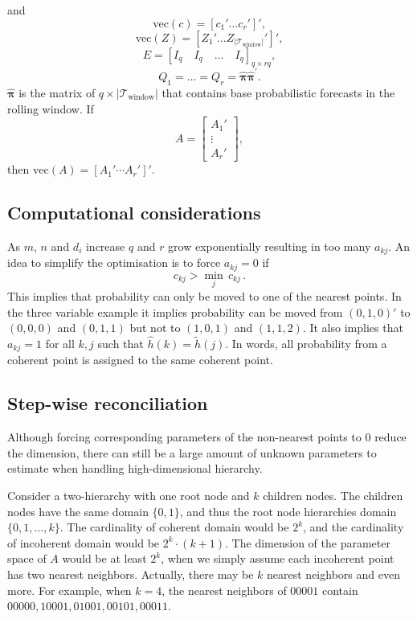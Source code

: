 \documentclass[a4paper,review,12pt,authoryear]{elsarticle}
\begin{document}
    and
    \[\textrm{vec}(c) = \left[c_1' \dots c_r'\right]',\]
    \[\textrm{vec}(Z) = \left[Z_1' \dots Z_{|\mathcal{T}_{\textrm{window}}|}'\right]',\]
    \[E = [I_q \quad I_q  \quad \dots \quad I_q]_{q\times rq},\]
    \[Q_1 =\dots =Q_r = \hat{\boldsymbol{\pi}}\hat{\boldsymbol{\pi}}^\prime.\] $\hat{\boldsymbol{\pi}}$ is the matrix of $q \times |\mathcal{T}_{\textrm{window}}|$ that contains base probabilistic forecasts in the rolling window. If \[A = \left[\begin{matrix}
      A_1' \\ \vdots \\ A_r'
    \end{matrix}\right],\] then $\textrm{vec}(A) = [A_1' \cdots A_r']'$.    

    
    \subsection{Computational considerations}
    
    As $m$, $n$ and $d_i$ increase $q$ and $r$ grow exponentially resulting in too many $a_{kj}$. An idea to simplify the optimisation is to force $a_{kj}=0$ if 
    \[
     c_{kj}>\underset{j}{\min}\,c_{kj}\,.
    \]  
    This implies that probability can only be moved to one of the nearest points. In the three variable example it implies probability can be moved from $(0,1,0)'$ to $(0,0,0)$ and $(0,1,1)$ but not to $(1,0,1)$ and $(1,1,2)$. It also implies that $a_{kj}=1$ for all $k,j$ such that $\hat{h}(k)=\tilde{h}(j)$. In words, all probability from a coherent point is assigned to the same coherent point.

   \subsection{Step-wise reconciliation}

   Although forcing corresponding parameters of the non-nearest points to 0 reduce the dimension, there can still be a large amount of unknown parameters to estimate when handling high-dimensional hierarchy. 
   
   Consider a two-hierarchy with one root node and $k$ children nodes. 
   The children nodes have the same domain $\{0, 1\}$, and thus the root node hierarchies domain $\{0, 1, \dots, k\}$.
   The cardinality of coherent domain would be $2^k$, and the cardinality of incoherent domain would be $2^k\cdot (k+1)$. 
   The dimension of the parameter space of $A$ would be at least $2^k$, when we simply assume each incoherent point has two nearest neighbors. Actually, there may be $k$ nearest neighbors and even more. For example, when $k=4$, the nearest neighbors of $00001$ contain $00000, 10001, 01001, 00101, 00011$.
\end{document}
